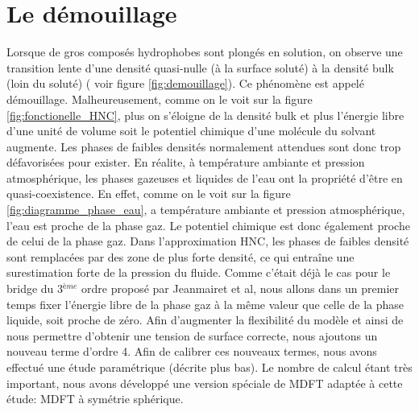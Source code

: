 \section{Le démouillage}
Lorsque de gros composés hydrophobes sont plongés en solution, on observe une transition lente d'une densité quasi-nulle (à la surface soluté) à la densité bulk (loin du soluté) ( voir figure \ref{fig:demouillage}). Ce phénomène est appelé démouillage. Malheureusement, comme on le voit sur la figure \ref{fig:fonctionelle_HNC}, plus on s'éloigne de la densité bulk et plus l'énergie libre d'une unité de volume soit le potentiel chimique d'une molécule du solvant augmente. Les phases de faibles densités normalement attendues sont donc trop défavorisées pour exister. En réalite, à température ambiante et pression atmosphérique, les phases gazeuses et liquides de l'eau ont la propriété d'être en quasi-coexistence. En effet, comme on le voit sur la figure \ref{fig:diagramme_phase_eau}, a température ambiante et pression atmosphérique, l'eau est proche de la phase gaz. Le potentiel chimique est donc également proche de celui de la phase gaz. Dans l'approximation HNC, les phases de faibles densité sont remplacées par des zone de plus forte densité, ce qui entraîne une surestimation forte de la pression du fluide. Comme c'était déjà le cas pour le bridge du 3$^{ème}$ ordre proposé par Jeanmairet et al\cite{jeanmairet_molecular_2013}, nous allons dans un premier temps fixer l'énergie libre de la phase gaz à la même valeur que celle de la phase liquide, soit proche de zéro. Afin d'augmenter la flexibilité du modèle et ainsi de nous permettre d'obtenir une tension de surface correcte, nous ajoutons un nouveau terme d'ordre 4. Afin de calibrer ces nouveaux termes, nous avons effectué une étude paramétrique (décrite plus bas). Le nombre de calcul étant très important, nous avons développé une version spéciale de MDFT adaptée à cette étude: MDFT à symétrie sphérique. 





